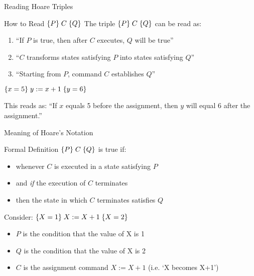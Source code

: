 \begin{frame}{Reading Hoare Triples}
    \begin{block}{How to Read $\{P\}\; C\; \{Q\}$}
        The triple $\{P\}\; C\; \{Q\}$ can be read as:
        \begin{enumerate}
            \item ``If $P$ is true, then after $C$ executes, $Q$ will be true''
            \item ``$C$ transforms states satisfying $P$ into states satisfying $Q$''
            \item ``Starting from $P$, command $C$ establishes $Q$''
        \end{enumerate}
    \end{block}
    
    \begin{example}
        $\{x = 5\}\; y := x + 1\; \{y = 6\}$
        
        This reads as: ``If $x$ equals 5 before the assignment, then $y$ will equal 6 after the assignment.''
    \end{example}
\end{frame}

\begin{frame}{Meaning of Hoare's Notation}
    \begin{block}{Formal Definition}
        $\{P\}\; C\; \{Q\}$ is true if:
        \begin{itemize}
            \item whenever $C$ is executed in a state satisfying $P$
            \item and \emph{if} the execution of $C$ terminates
            \item then the state in which $C$ terminates satisfies $Q$
        \end{itemize}
    \end{block}
    
    \begin{example}
        Consider: $\{X = 1\}\; X := X + 1\; \{X = 2\}$
        \begin{itemize}
            \item $P$ is the condition that the value of X is 1
            \item $Q$ is the condition that the value of X is 2
            \item $C$ is the assignment command $X := X + 1$ (i.e. `X becomes X+1')
        \end{itemize}
    \end{example}
\end{frame}

